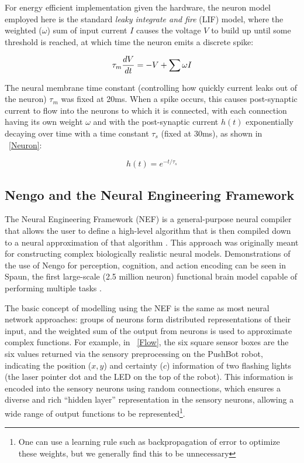 \documentclass{frontiersSCNS}
\begin{document}
For energy efficient implementation given the hardware, the neuron model
employed here is the standard \textit{leaky integrate and fire} (LIF) model, 
where the weighted ($\omega$) sum of input current $I$ causes the voltage $V$ to build up until some
threshold is reached, at which time the neuron emits a discrete spike:

\begin{equation}
    \tau_m {dV \over dt} = -V + \sum \omega I
\end{equation}

The neural membrane time constant (controlling how quickly current leaks
out of the neuron) $\tau_m$ was fixed at 20ms.  When a spike occurs, this causes 
post-synaptic current to flow into the 
neurons to which it is connected, with each connection having its own weight $\omega$
and with the post-synaptic current $h(t)$ exponentially decaying over time with
a time constant $\tau_s$ (fixed at 30ms), as shown in \figurename~\ref{Neuron}:

\begin{equation}
    h(t) = e^{-t/\tau_s}
\end{equation}

\subsection{Nengo and the Neural Engineering Framework}

The Neural Engineering Framework (NEF) is a general-purpose neural compiler 
that allows the user to define a high-level algorithm that is then compiled 
down to a neural approximation of that algorithm \citep{eliasmith2004neural}. 
This approach was originally meant for constructing complex biologically realistic neural 
models. Demonstrations of the use of Nengo for perception, cognition, and 
action encoding can be seen in Spaun, the first large-scale 
(2.5 million neuron) functional brain model capable of performing multiple 
tasks  \citep{eliasmith_largescale_2012}. 

The basic concept of modelling using the NEF is the same as most neural network
approaches: groups of neurons form distributed representations of their input,
and the weighted sum of the output from neurons is used to approximate
complex functions.  For example, in \figurename~\ref{Flow}, the six square
sensor boxes are the six values returned via the sensory preprocessing on the
PushBot robot, indicating the position ($x, y$) and certainty ($c$) information 
of two flashing lights (the laser pointer dot and the LED on the top of the
robot).  This information is encoded into the sensory neurons using random
connections, which ensures a diverse and rich ``hidden layer''
representation in the sensory neurons, allowing a wide range of output
functions to be represented\footnote{One can use a
learning rule such as backpropagation of error to optimize these weights,
but we generally find this to be unnecessary}.
\end{document}
